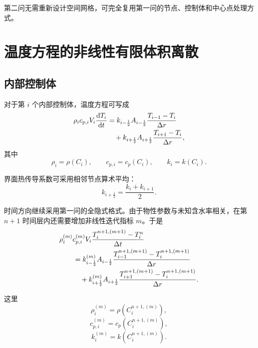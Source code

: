 \documentclass[UTF8,a4paper,12pt]{ctexart}
\begin{document}
第二问无需重新设计空间网格，可完全复用第一问的节点、控制体和中心点处理方式。

\section{温度方程的非线性有限体积离散}

\subsection{内部控制体}

对于第 $i$ 个内部控制体，温度方程可写成
\begin{align}
    \rho_i c_{p,i}V_i
    \frac{\mathrm{d}T_i}{\mathrm{d}t}
    &=
    k_{i-\frac12}A_{i-\frac12}
    \frac{T_{i-1}-T_i}{\Delta r}
    \notag\\
    &\quad+
    k_{i+\frac12}A_{i+\frac12}
    \frac{T_{i+1}-T_i}{\Delta r},
    \label{eq:heat-fvm}
\end{align}
其中
\begin{equation}
    \rho_i=\rho(C_i),\qquad
    c_{p,i}=c_p(C_i),\qquad
    k_i=k(C_i).
\end{equation}

界面热传导系数可采用相邻节点算术平均：
\begin{equation}
    k_{i+\frac12}
    =
    \frac{k_i+k_{i+1}}{2}.
    \label{eq:kface}
\end{equation}

时间方向继续采用第一问的全隐式格式。由于物性参数与未知含水率相关，在第 $n+1$ 时间层内还需要增加非线性迭代指标 $m$。于是
\begin{align}
    &\rho_i^{(m)}c_{p,i}^{(m)}V_i
    \frac{T_i^{n+1,(m+1)}-T_i^n}{\Delta t}
    \notag\\
    &\qquad=
    k_{i-\frac12}^{(m)}A_{i-\frac12}
    \frac{T_{i-1}^{n+1,(m+1)}-T_i^{n+1,(m+1)}}{\Delta r}
    \notag\\
    &\qquad\quad+
    k_{i+\frac12}^{(m)}A_{i+\frac12}
    \frac{T_{i+1}^{n+1,(m+1)}-T_i^{n+1,(m+1)}}{\Delta r}.
    \label{eq:heat-iteration}
\end{align}

这里
\begin{equation}
    \rho_i^{(m)}=\rho\!\left(C_i^{n+1,(m)}\right),
\end{equation}
\begin{equation}
    c_{p,i}^{(m)}
    =
    c_p\!\left(C_i^{n+1,(m)}\right),
\end{equation}
\begin{equation}
    k_i^{(m)}
    =
    k\!\left(C_i^{n+1,(m)}\right).
\end{equation}
\end{document}
